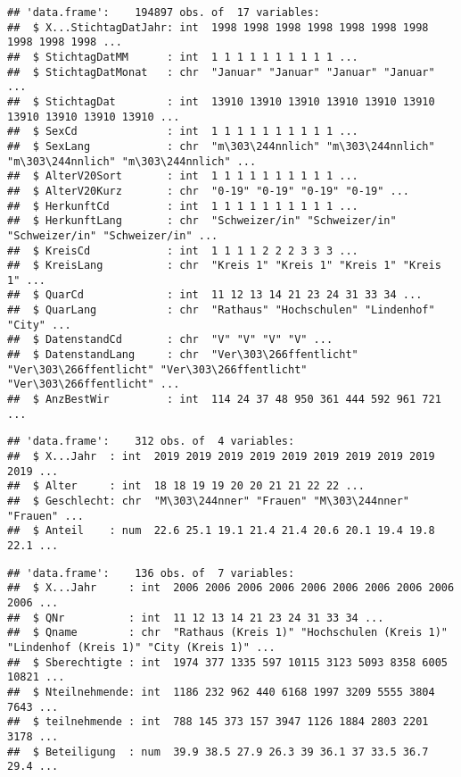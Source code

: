 \documentclass[
]{article}
\begin{document}
\begin{verbatim}
## 'data.frame':    194897 obs. of  17 variables:
##  $ X...StichtagDatJahr: int  1998 1998 1998 1998 1998 1998 1998 1998 1998 1998 ...
##  $ StichtagDatMM      : int  1 1 1 1 1 1 1 1 1 1 ...
##  $ StichtagDatMonat   : chr  "Januar" "Januar" "Januar" "Januar" ...
##  $ StichtagDat        : int  13910 13910 13910 13910 13910 13910 13910 13910 13910 13910 ...
##  $ SexCd              : int  1 1 1 1 1 1 1 1 1 1 ...
##  $ SexLang            : chr  "m\303\244nnlich" "m\303\244nnlich" "m\303\244nnlich" "m\303\244nnlich" ...
##  $ AlterV20Sort       : int  1 1 1 1 1 1 1 1 1 1 ...
##  $ AlterV20Kurz       : chr  "0-19" "0-19" "0-19" "0-19" ...
##  $ HerkunftCd         : int  1 1 1 1 1 1 1 1 1 1 ...
##  $ HerkunftLang       : chr  "Schweizer/in" "Schweizer/in" "Schweizer/in" "Schweizer/in" ...
##  $ KreisCd            : int  1 1 1 1 2 2 2 3 3 3 ...
##  $ KreisLang          : chr  "Kreis 1" "Kreis 1" "Kreis 1" "Kreis 1" ...
##  $ QuarCd             : int  11 12 13 14 21 23 24 31 33 34 ...
##  $ QuarLang           : chr  "Rathaus" "Hochschulen" "Lindenhof" "City" ...
##  $ DatenstandCd       : chr  "V" "V" "V" "V" ...
##  $ DatenstandLang     : chr  "Ver\303\266ffentlicht" "Ver\303\266ffentlicht" "Ver\303\266ffentlicht" "Ver\303\266ffentlicht" ...
##  $ AnzBestWir         : int  114 24 37 48 950 361 444 592 961 721 ...
\end{verbatim}

\begin{verbatim}
## 'data.frame':    312 obs. of  4 variables:
##  $ X...Jahr  : int  2019 2019 2019 2019 2019 2019 2019 2019 2019 2019 ...
##  $ Alter     : int  18 18 19 19 20 20 21 21 22 22 ...
##  $ Geschlecht: chr  "M\303\244nner" "Frauen" "M\303\244nner" "Frauen" ...
##  $ Anteil    : num  22.6 25.1 19.1 21.4 21.4 20.6 20.1 19.4 19.8 22.1 ...
\end{verbatim}

\begin{verbatim}
## 'data.frame':    136 obs. of  7 variables:
##  $ X...Jahr     : int  2006 2006 2006 2006 2006 2006 2006 2006 2006 2006 ...
##  $ QNr          : int  11 12 13 14 21 23 24 31 33 34 ...
##  $ Qname        : chr  "Rathaus (Kreis 1)" "Hochschulen (Kreis 1)" "Lindenhof (Kreis 1)" "City (Kreis 1)" ...
##  $ Sberechtigte : int  1974 377 1335 597 10115 3123 5093 8358 6005 10821 ...
##  $ Nteilnehmende: int  1186 232 962 440 6168 1997 3209 5555 3804 7643 ...
##  $ teilnehmende : int  788 145 373 157 3947 1126 1884 2803 2201 3178 ...
##  $ Beteiligung  : num  39.9 38.5 27.9 26.3 39 36.1 37 33.5 36.7 29.4 ...
\end{verbatim}
\end{document}
